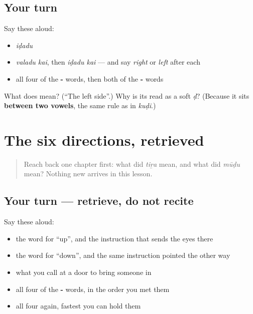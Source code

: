 \subsection*{Your turn}
Say these aloud:

\begin{itemize}
\raggedright
  \item \emph{iḍadu}
  \item \emph{valadu kai}, then \emph{iḍadu kai} — and say \emph{right} or \emph{left} after each
  \item all four of the \textbf{-} words, then both of the \textbf{-} words
\end{itemize}

\begin{tcolorbox}[breakable,colback=teal!4,colframe=teal!35!black,title={Before you move on}]
What does  mean? (\textquotedblleft{}The left side\textquotedblright{}.) Why is its \textbf{} read as a soft \emph{ḍ}? (Because it sits \textbf{between two vowels}, the same rule as in \emph{kuḍi}.)
\end{tcolorbox}
\section[Practice]{The six directions, retrieved}

\label{lesson:TA-C66-whichway-recall}



\begin{quote}
Reach back one chapter first: what did \emph{tiṟa} mean, and what did \emph{mūḍu} mean? Nothing new arrives in this lesson.
\end{quote}

\subsection*{Your turn — retrieve, do not recite}
Say these aloud:

\begin{itemize}
\raggedright
  \item the word for \textquotedblleft{}up\textquotedblright{}, and the instruction that sends the eyes there
  \item the word for \textquotedblleft{}down\textquotedblright{}, and the same instruction pointed the other way
  \item what you call at a door to bring someone in
  \item all four of the \textbf{-} words, in the order you met them
  \item all four again, fastest you can hold them
\end{itemize}

